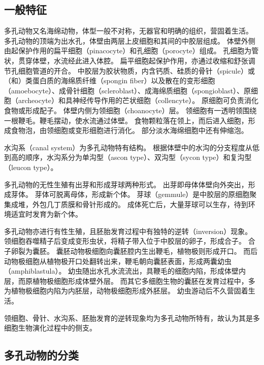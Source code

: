 \documentclass[11pt]{article}
\begin{document}
\subsection{一般特征}
多孔动物又名海绵动物，体型一般不对称，无器官和明确的组织，营固着生活。
多孔动物的顶端为出水孔，体壁由两层上皮细胞和其间的中胶层组成。
体壁外侧由起保护作用的扁平细胞（pinacocyte）和孔细胞（porocyte）组成。
孔细胞为管状，贯穿体壁，水流经此进入体腔。
扁平细胞起保护作用，亦通过收缩和舒张调节孔细胞管道的开合。
中胶层为胶状物质，内含钙质、硅质的骨针（spicule）或（和）类蛋白质的海绵质纤维（spongin fiber）以及散在的变形细胞（amoebocyte）、成骨针细胞（scleroblast）、成海绵质细胞（spongioblast）、原细胞（archeocyte）和具神经传导作用的芒状细胞（collencyte）。
原细胞可负责消化食物或形成配子。
体壁内侧为领细胞（choanocyte）层。
领细胞有一透明领围绕一根鞭毛。鞭毛摆动，使水流通过体壁。
食物颗粒落在领上，而后进入细胞，形成食物泡，由领细胞或变形细胞进行消化。
部分淡水海绵细胞中还有伸缩泡。

\newline

水沟系（canal system）为多孔动物特有结构。
根据体壁中的水沟的分支程度从低到高的顺序，水沟系分为单沟型（ascon type）、双沟型（sycon type）和复沟型（leucon type）。

\newline

多孔动物的无性生殖有出芽和形成芽球两种形式。
出芽即母体体壁向外突出，形成芽体。
芽体可脱离母体，形成新个体。
芽球（gemmule）是中胶层的原细胞聚集成堆，外包几丁质膜和骨针形成的。
成体死亡后，大量芽球可以生存，待到环境适宜时发育为新个体。

\newline

多孔动物亦进行有性生殖，且胚胎发育过程中有独特的逆转（inversion）现象。
领细胞吞噬精子后变成变形虫状，将精子带入位于中胶层的卵子，形成合子。
合子卵裂为囊胚。
囊胚动物极细胞向囊胚腔内生出鞭毛，植物极则形成开口。
而后动物极细胞从植物极开口处翻转出来，鞭毛朝向囊胚表面，形成两囊幼虫（amphiblastula）。
幼虫随出水孔水流流出，具鞭毛的细胞内陷，形成体壁内层，而原植物极细胞形成体壁外层。
而其它多细胞生物的囊胚在发育过程中，多为植物极细胞内陷为内胚层，动物极细胞形成外胚层。
幼虫游动后不久营固着生活。

\newline

领细胞、骨针、水沟系、胚胎发育的逆转现象均为多孔动物所特有，故认为其是多细胞生物演化过程中的侧支。

\subsection{多孔动物的分类}
\end{document}
